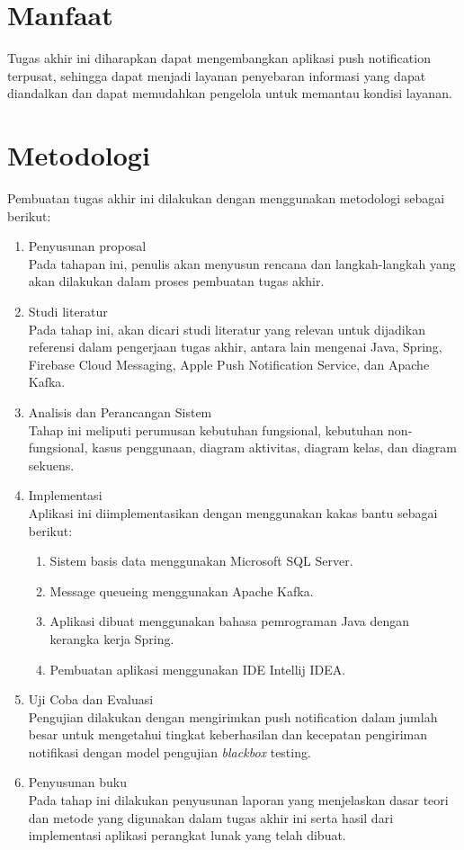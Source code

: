 \section{Manfaat}
Tugas akhir ini diharapkan dapat mengembangkan aplikasi push notification terpusat, sehingga dapat menjadi layanan penyebaran informasi yang dapat diandalkan dan dapat memudahkan pengelola untuk memantau kondisi layanan.

\section {Metodologi}
Pembuatan tugas akhir ini dilakukan dengan menggunakan metodologi sebagai berikut:
\begin{enumerate}
\item Penyusunan proposal\\
Pada tahapan ini, penulis akan menyusun rencana dan langkah-langkah yang akan dilakukan dalam proses pembuatan tugas akhir.
\item Studi literatur\\
Pada tahap ini, akan dicari studi literatur yang relevan untuk dijadikan referensi dalam pengerjaan tugas akhir, antara lain mengenai Java, Spring, Firebase Cloud Messaging, Apple Push Notification Service, dan Apache Kafka.
\item Analisis dan Perancangan Sistem\\
Tahap ini meliputi perumusan kebutuhan fungsional, kebutuhan non-fungsional, kasus penggunaan, diagram aktivitas, diagram kelas, dan diagram sekuens.
\item Implementasi\\
Aplikasi ini diimplementasikan dengan menggunakan kakas bantu sebagai berikut:
\begin{enumerate}
\item Sistem basis data menggunakan Microsoft SQL Server.
\item Message queueing menggunakan Apache Kafka.
\item Aplikasi dibuat menggunakan bahasa pemrograman Java dengan kerangka kerja Spring.
\item Pembuatan aplikasi menggunakan IDE Intellij IDEA.
\end{enumerate}
\item Uji Coba dan Evaluasi\\
Pengujian dilakukan dengan mengirimkan push notification dalam jumlah besar untuk mengetahui tingkat keberhasilan dan kecepatan pengiriman notifikasi dengan model pengujian \textit{blackbox} testing.
\item Penyusunan buku\\
Pada tahap ini dilakukan penyusunan laporan yang menjelaskan dasar teori dan metode yang digunakan dalam tugas akhir ini serta hasil dari implementasi aplikasi perangkat lunak yang telah dibuat.
\end{enumerate}

